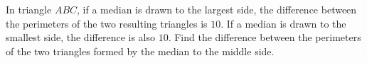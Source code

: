 In triangle $ABC$, if a median is drawn to the largest side, the difference between the perimeters of the two resulting triangles is $10$. If a median is drawn to the smallest side, the difference is also $10$. Find the difference between the perimeters of the two triangles formed by the median to the middle side.
